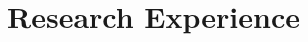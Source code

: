\section{Research Experience}

\expVesselSeg
\expPostdocXray
\expCOPD
\expPhDXray
\expCryoET
\expToad
